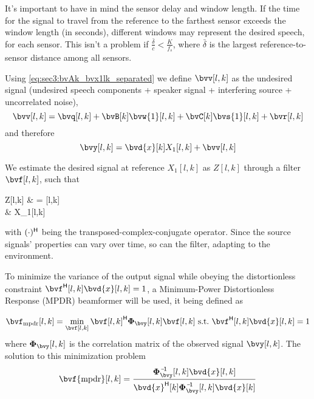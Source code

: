 It's important to have in mind the sensor delay and window length. If the time for the signal to travel from the reference to the farthest sensor exceeds the window length (in seconds), different windows may represent the desired speech, for each sensor. This isn't a problem if $\frac{\bar{\delta}}{c} < \frac{K}{f_s}$, where $\bar{\delta}$ is the largest reference-to-sensor distance among all sensors.

Using \cref{eq:sec3:bvAk_bvx1lk_separated} we define $\bvv[l,k]$ as the undesired signal (undesired speech components + speaker signal + interfering source + uncorrelated noise),
\begin{equation}
	\label{eq:sec3:def_undes_sig_bvwlk}
	\bvv[l,k] = \bvq[l,k] + \bvB[k] \bvw{1}[l,k] + \bvC[k] \bvs{1}[l,k] + \bvr[l,k]
\end{equation}
and therefore
\begin{equation}
	\label{eq:sec3:time-freq_model_final}
	\bvy[l,k] = \bvd{x}[k] X_1[l,k] + \bvv[l,k]
\end{equation}

We estimate the desired signal at reference $X_1[l,k]$ as $Z[l,k]$ through a filter $\bvf[l,k]$, such that
\begin{equations}
	Z[l,k]
	& = \he{\bvf}[l,k] \bvy[l,k] \\
	& \approx X_1[l,k]
\end{equations}
with $\he{(\cdot)}$ being the transposed-complex-conjugate operator. Since the source signals' properties can vary over time, so can the filter, adapting to the environment.

To minimize the variance of the output signal while obeying the distortionless constraint $\he{\bvf}[l,k] \bvd{x}[l,k] = 1$, a Minimum-Power Distortionless Response (MPDR) beamformer will be used, it being defined as

\begin{equation}
	\label{eq:sec3:minimization_problem_mpdr}
	\bvf_{\mpdr}[l,k] = \min_{\bvf[l,k]} \he{\bvf[l,k]} \Corr{\bvy}[l,k] \bvf[l,k]~\text{s.t.}~\he{\bvf}[l,k] \bvd{x}[l,k] = 1
\end{equation}
where $\Corr{\bvy}[l,k]$ is the correlation matrix of the observed signal $\bvy[l,k]$. The solution to this minimization problem 
\begin{equation}
	\label{eq:sec3:solution_mpdr_beamformer}
	\bvf{\mpdr}[l,k] = \frac{\inv{\Corr{\bvy}}[l,k] \bvd{x}[l,k]}{\he{\bvd{x}}[k] \inv{\Corr{\bvy}}[l,k] \bvd{x}[k]}
\end{equation}

